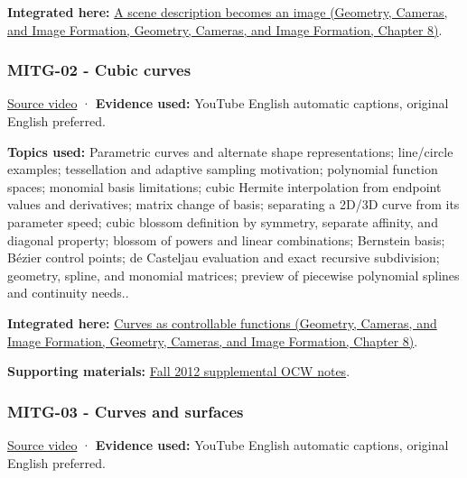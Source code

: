 \textbf{Integrated here:} \href{../03-Geometry-Cameras-and-Image-Formation/main.pdf\#nameddest=03-visual-computing-i-ch001-a-scene-description-becomes-an-image}{A scene description becomes an image (Geometry, Cameras, and Image Formation, Geometry, Cameras, and Image Formation, Chapter 8)}.

\subsubsection{MITG-02 - Cubic curves}\label{04-visual-computing-ii-ch036-mitg-02---cubic-curves}

\href{https://www.youtube.com/watch?v=1BZ0ayVjWEk}{Source video} · \textbf{Evidence used:} YouTube English automatic captions, original English preferred.

\textbf{Topics used:} Parametric curves and alternate shape representations; line/circle examples; tessellation and adaptive sampling motivation; polynomial function spaces; monomial basis limitations; cubic Hermite interpolation from endpoint values and derivatives; matrix change of basis; separating a 2D/3D curve from its parameter speed; cubic blossom definition by symmetry, separate affinity, and diagonal property; blossom of powers and linear combinations; Bernstein basis; Bézier control points; de Casteljau evaluation and exact recursive subdivision; geometry, spline, and monomial matrices; preview of piecewise polynomial splines and continuity needs..

\textbf{Integrated here:} \href{../03-Geometry-Cameras-and-Image-Formation/main.pdf\#nameddest=03-visual-computing-i-ch001-curves-as-controllable-functions}{Curves as controllable functions (Geometry, Cameras, and Image Formation, Geometry, Cameras, and Image Formation, Chapter 8)}.

\textbf{Supporting materials:} \href{https://ocw.mit.edu/courses/6-837-computer-graphics-fall-2012/pages/lecture-notes/}{Fall 2012 supplemental OCW notes}.

\subsubsection{MITG-03 - Curves and surfaces}\label{04-visual-computing-ii-ch036-mitg-03---curves-and-surfaces}

\href{https://www.youtube.com/watch?v=LzIjSdNoR9s}{Source video} · \textbf{Evidence used:} YouTube English automatic captions, original English preferred.

